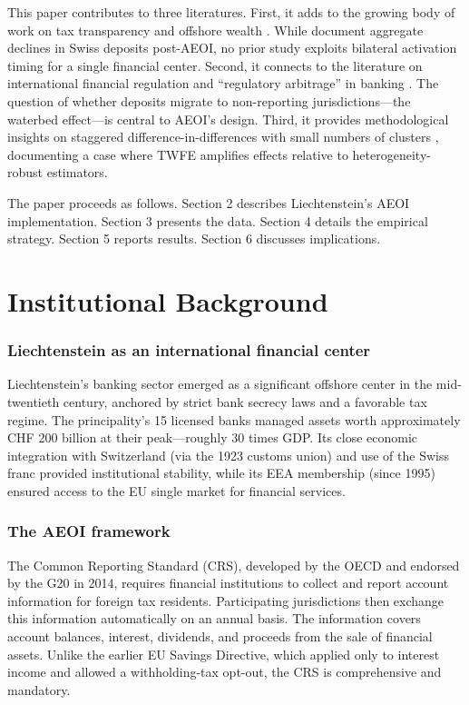 \documentclass[12pt]{article}
\begin{document}
This paper contributes to three literatures. First, it adds to the growing body of work on tax transparency and offshore wealth \citep{johannesen2014end, zucman2013missing, menkhoff2022tax, alstadsaeter2019tax, bomare2022tax}. While \citet{menkhoff2022tax} document aggregate declines in Swiss deposits post-AEOI, no prior study exploits bilateral activation timing for a single financial center. Second, it connects to the literature on international financial regulation and ``regulatory arbitrage'' in banking \citep{houston2012regulatory, karolyi2015regulatory}. The question of whether deposits migrate to non-reporting jurisdictions---the waterbed effect---is central to AEOI's design. Third, it provides methodological insights on staggered difference-in-differences with small numbers of clusters \citep{sun2021estimating, callaway2021difference, roodman2019fast}, documenting a case where TWFE amplifies effects relative to heterogeneity-robust estimators.

The paper proceeds as follows. Section 2 describes Liechtenstein's AEOI implementation. Section 3 presents the data. Section 4 details the empirical strategy. Section 5 reports results. Section 6 discusses implications.


\section{Institutional Background}

\subsubsection*{Liechtenstein as an international financial center} Liechtenstein's banking sector emerged as a significant offshore center in the mid-twentieth century, anchored by strict bank secrecy laws and a favorable tax regime. The principality's 15 licensed banks managed assets worth approximately CHF 200 billion at their peak---roughly 30 times GDP. Its close economic integration with Switzerland (via the 1923 customs union) and use of the Swiss franc provided institutional stability, while its EEA membership (since 1995) ensured access to the EU single market for financial services.

\subsubsection*{The AEOI framework} The Common Reporting Standard (CRS), developed by the OECD and endorsed by the G20 in 2014, requires financial institutions to collect and report account information for foreign tax residents. Participating jurisdictions then exchange this information automatically on an annual basis. The information covers account balances, interest, dividends, and proceeds from the sale of financial assets. Unlike the earlier EU Savings Directive, which applied only to interest income and allowed a withholding-tax opt-out, the CRS is comprehensive and mandatory.
\end{document}
